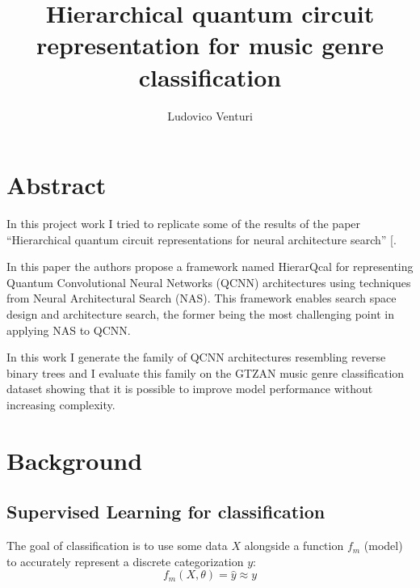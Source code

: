 \documentclass[
  13pt,
  a4paper,
  DIV=11,
  numbers=noendperiod,
  oneside]{scrreprt}
\title{Hierarchical quantum circuit representation for music genre
classification}
\author{Ludovico Venturi}
\date{}
\renewcommand*\contentsname{Table of contents}
\newcommand\contentsname{Table of contents}
\begin{document}
\maketitle


\renewcommand*\contentsname{Table of contents}
{
\hypersetup{linkcolor=}
\setcounter{tocdepth}{2}
\tableofcontents
}

\chapter*{Abstract}\label{abstract}


In this project work I tried to replicate some of the results of the
paper ``Hierarchical quantum circuit representations for neural
architecture search'' {[}\citeproc{ref-lourens2023hierarchical}{1}{]}.

In this paper the authors propose a framework named HierarQcal for
representing Quantum Convolutional Neural Networks (QCNN) architectures
using techniques from Neural Architectural Search (NAS). This framework
enables search space design and architecture search, the former being
the most challenging point in applying NAS to QCNN.

In this work I generate the family of QCNN architectures resembling
reverse binary trees and I evaluate this family on the GTZAN music genre
classification dataset showing that it is possible to improve model
performance without increasing complexity.


\chapter{Background}\label{background}

\section{Supervised Learning for
classification}\label{supervised-learning-for-classification}

The goal of classification is to use some data \(X\) alongside a
function \(f_m\) (model) to accurately represent a discrete
categorization \(y\): \[
f_m(X, \theta) = \widehat{y} \approx y
\]
\end{document}
